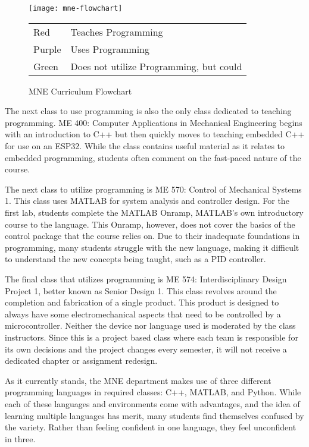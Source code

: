 \begin{figure}[!htbp]
    \texttt{[image: mne-flowchart]}
    \begin{tabular}{l@{ : }l}
        Red & Teaches Programming \\
        Purple & Uses Programming \\
        Green & Does not utilize Programming, but could \\
    \end{tabular}
    \centering
    \caption{MNE Curriculum Flowchart}
    \centering
    \label{fig:mne_flowchart}
\end{figure}

The next class to use programming is also the only class dedicated to teaching programming.
ME 400: Computer Applications in Mechanical Engineering begins with an introduction to C++
but then quickly moves to teaching embedded C++ for use on an ESP32. While the class
contains useful material as it relates to embedded programming, students often comment on
the fast-paced nature of the course.

The next class to utilize programming is ME 570: Control of Mechanical Systems 1. This class
uses MATLAB for system analysis and controller design. For the first lab, students complete the
MATLAB Onramp, MATLAB's own introductory course to the language. This Onramp, however, does
not cover the basics of the control package that the course relies on. Due to their inadequate 
foundations in programming, many students struggle with the new language, making it difficult 
to understand the new concepts being taught, such as a PID controller.

The final class that utilizes programming is ME 574: Interdisciplinary Design Project 1, 
better known as Senior Design 1. This class revolves around the completion and fabrication
of a single product. This product is designed to always have some electromechanical aspects that need to
be controlled by a microcontroller. Neither the device nor language used is moderated by
the class instructors. Since this is a project based class where each team is responsible
for its own decisions and the project changes every semester, it will not receive a dedicated
chapter or assignment redesign.

As it currently stands, the MNE department makes use of three different programming languages
in required classes: C++, MATLAB, and Python. While each of these languages and 
environments come with advantages, and the idea of learning multiple languages has merit,
many students find themselves confused by the variety. Rather than
feeling confident in one language, they feel unconfident in three.


